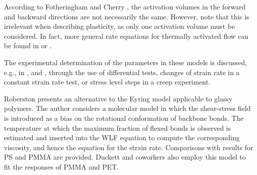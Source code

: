 According to Fotheringham and Cherry \citep{fotheringhamRoleRecoveryForces1978}, the activation volumes in the forward and backward directions are not necessarily the same.
However, note that this is irrelevant when describing plasticity, as only one activation volume must be considered.
In fact, more general rate equations for thermally activated flow can be found in \cite{brinkmanMechanicalThermodynamicalTheory1957} or \cite{kocks1975thermodynamics}.

The experimental determination of the parameters in these models is discussed, e.g., in \cite{evansThermallyActivatedDeformation1969}, \cite{conradAthermalComponentFlow1970} and \cite{kocks1975thermodynamics}, through the use of differential tests, changes of strain rate in a constant strain rate test, or stress level steps in a creep experiment.


Roberston \citep{robertsonTheoryPlasticityGlassy1966} presents an alternative to the Eyring model applicable to glassy polymers.
The author considers a molecular model in which the shear-stress field is introduced as a bias on the rotational conformation of backbone bonds.
The temperature at which the maximum fraction of flexed bonds is observed is estimated and inserted into the WLF equation to compute the corresponding viscosity, and hence the equation for the strain rate.
Comparisons with results for PS and PMMA are provided.
Duckett and coworkers \citep{duckettStrainrateTemperaturePressure1970} also employ this model to fit the responses of PMMA and PET.

